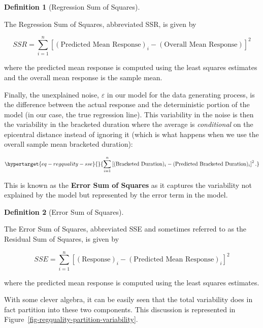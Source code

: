 \documentclass[
  letterpaper,
  DIV=11,
  numbers=noendperiod]{scrreprt}
\theoremstyle{plain}
\theoremstyle{definition}
\theoremstyle{definition}
\newtheorem{definition}{Definition}[chapter]
\theoremstyle{remark}
\begin{document}
\begin{definition}[Regression Sum of
Squares]\protect\hypertarget{def-ssr}{}\label{def-ssr}

The Regression Sum of Squares, abbreviated SSR, is given by

\[SSR = \sum_{i=1}^{n} \left[(\text{Predicted Mean Response})_i - (\text{Overall Mean Response})\right]^2\]

where the predicted mean response is computed using the least squares
estimates and the overall mean response is the sample mean.

\end{definition}

Finally, the unexplained noise, \(\varepsilon\) in our model for the
data generating process, is the difference between the actual response
and the deterministic portion of the model (in our case, the true
regression line). This variability in the noise is then the variability
in the bracketed duration where the average is \emph{conditional} on the
epicentral distance instead of ignoring it (which is what happens when
we use the overall sample mean bracketed duration):

\begin{equation}\protect\hypertarget{eq-regquality-sse}{}{\sum_{i=1}^{n} \left[(\text{Bracketed Duration})_i - (\text{Predicted Bracketed Duration})_i\right]^2.}\label{eq-regquality-sse}\end{equation}

This is known as the \textbf{Error Sum of Squares} as it captures the
variability not explained by the model but represented by the error term
in the model.

\begin{definition}[Error Sum of
Squares]\protect\hypertarget{def-sse}{}\label{def-sse}

The Error Sum of Squares, abbreviated SSE and sometimes referred to as
the Residual Sum of Squares, is given by

\[SSE = \sum_{i=1}^{n} \left[(\text{Response})_i - (\text{Predicted Mean Response})_i\right]^2\]

where the predicted mean response is computed using the least squares
estimates.

\end{definition}

With some clever algebra, it can be easily seen that the total
variability does in fact partition into these two components. This
discussion is represented in
Figure~\ref{fig-regquality-partition-variability}.
\end{document}
